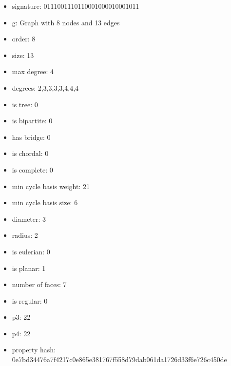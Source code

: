 \begin{itemize}
\item signature: 0111001110110001000010001011
\item g: Graph with 8 nodes and 13 edges
\item order: 8
\item size: 13
\item max degree: 4
\item degrees: 2,3,3,3,3,4,4,4
\item is tree: 0
\item is bipartite: 0
\item has bridge: 0
\item is chordal: 0
\item is complete: 0
\item min cycle basis weight: 21
\item min cycle basis size: 6
\item diameter: 3
\item radius: 2
\item is eulerian: 0
\item is planar: 1
\item number of faces: 7
\item is regular: 0
\item p3: 22
\item p4: 22
\item property hash: 0e7bd34476a7f4217c0e865e381767f558d79dab061da1726d33f6e726c450de
\end{itemize}
\newpage
\begin{figure}
\end{figure}
